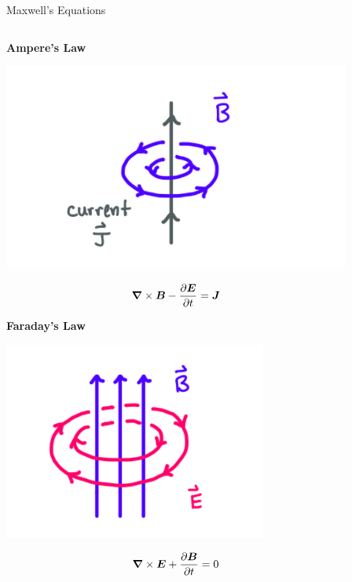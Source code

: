 \documentclass[UKenglish]{beamer}
\begin{document}
\begin{frame}{Maxwell's Equations}
\begin{columns}[c]
    
    \begin{center}
    
    \textbf{Ampere's Law}
    
    \includegraphics[scale=.4]{figures/ampere.png}
    
    \vspace{-10mm}
    
    \small
    $$ \boldsymbol{\nabla} \times \boldsymbol{B} - \frac{\partial \boldsymbol{E}}{\partial t} = \boldsymbol{J} $$
    
    \normalsize
    
    \textbf{Faraday's Law}
    
    \includegraphics[scale=.4]{figures/faraday.png}
    
    \vspace{-10mm}
    
    \small
    $$ \boldsymbol{\nabla} \times \boldsymbol{E} + \frac{\partial \boldsymbol{B}}{\partial t} = 0 $$ 
    \normalsize
    
    \end{center}
   
    
    \end{columns}
    
    
\end{frame}
\end{document}
